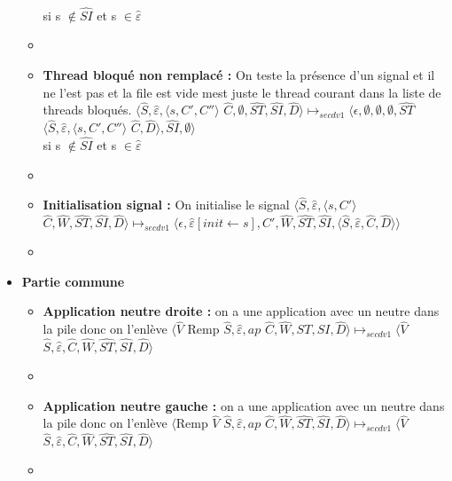 \documentclass[10pt,a4paper]{article}
\begin{document}
\begin{itemize}
\begin{itemize}
							\\si s $\notin \widehat{SI}$ et s $\in \widehat{\varepsilon}$ 
							\item[]
							\item[] \textbf{Thread bloqué non remplacé :} On teste la présence d'un signal et il ne l'est pas et la file est vide mest juste le thread courant dans la liste de threads bloqués.
							\smallbreak
							$\langle\widehat{S},\widehat{\varepsilon},\langle s, C',C''\rangle$ $\widehat{C},\emptyset,\widehat{ST},\widehat{SI},\widehat{D}\rangle 
							\longmapsto_{secdv1} 
							\langle\epsilon,\emptyset,\emptyset,\emptyset,\widehat{ST}$ $\langle\widehat{S},\widehat{\varepsilon},\langle s, C',C''\rangle$ $\widehat{C},\widehat{D}\rangle,\widehat{SI},\emptyset\rangle$ 
							\\si s $\notin \widehat{SI}$ et s $\in \widehat{\varepsilon}$ 
							\item[]
							\item[] \textbf{Initialisation signal :} On initialise le signal 
							\smallbreak 
							$\langle\widehat{S},\widehat{\varepsilon},\langle s, C'\rangle$ $\widehat{C},\widehat{W},\widehat{ST},\widehat{SI},\widehat{D}\rangle 
							\longmapsto_{secdv1} 
							\langle\epsilon,\widehat{\varepsilon}[init \leftarrow s],C',\widehat{W},\widehat{ST},\widehat{SI},\langle\widehat{S},\widehat{\varepsilon},\widehat{C},\widehat{D}\rangle\rangle$
							\item[] 
						\end{itemize}
						\item[] \textbf{Partie commune}
						\begin{itemize}
							\item[] \textbf{Application neutre droite :} on a une application avec un neutre dans la pile donc on l'enlève
							\smallbreak
							$\langle\widehat{V}$ Remp $\widehat{S},\widehat{\varepsilon},ap$ $\widehat{C},\widehat{W},\widehat{ST},\widehat{SI},\widehat{D}\rangle 
							\longmapsto_{secdv1} 
							\langle \widehat{V}$ $\widehat{S},\widehat{\varepsilon},\widehat{C},\widehat{W},\widehat{ST},\widehat{SI},\widehat{D}\rangle$
							\item[]
							\item[] \textbf{Application neutre gauche :} on a une application avec un neutre dans la pile donc on l'enlève
							\smallbreak
							$\langle$Remp $\widehat{V}$ $\widehat{S},\widehat{\varepsilon},ap$ $\widehat{C},\widehat{W},\widehat{ST},\widehat{SI},\widehat{D}\rangle 
							\longmapsto_{secdv1} 
							\langle \widehat{V}$ $\widehat{S},\widehat{\varepsilon},\widehat{C},\widehat{W},\widehat{ST},\widehat{SI},\widehat{D}\rangle$
							\item[]
						\end{itemize}
					\end{itemize}
				\bigbreak
				
\end{document}
